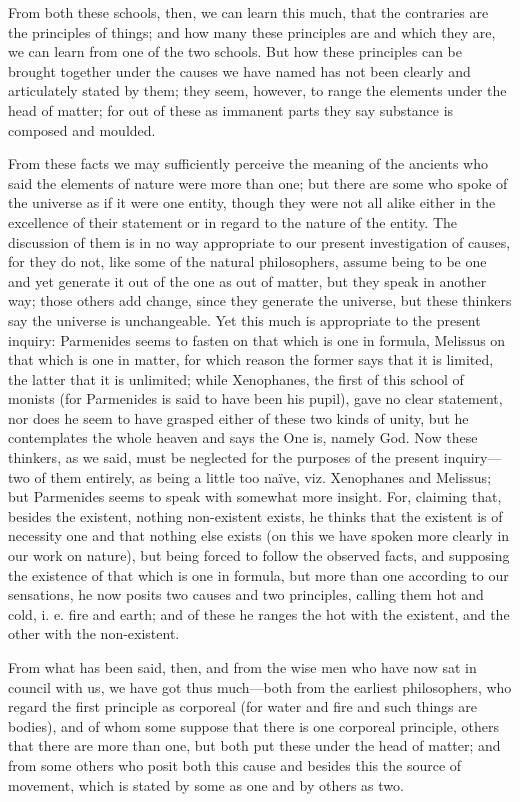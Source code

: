 From both these schools, then, we can learn this much, that the contraries are the principles of things; and how many these principles are and which they are, we can learn from one of the two schools. But how these principles can be brought together under the causes we have named has not been clearly and articulately stated by them; they seem, however, to range the elements under the head of matter; for out of these as immanent parts they say substance is composed and moulded.

From these facts we may sufficiently perceive the meaning of the ancients who said the elements of nature were more than one; but there are some who spoke of the universe as if it were one entity, though they were not all alike either in the excellence of their statement or in regard to the nature of the entity. The discussion of them is in no way appropriate to our present investigation of causes, for they do not, like some of the natural philosophers, assume being to be one and yet generate it out of the one as out of matter, but they speak in another way; those others add change, since they generate the universe, but these thinkers say the universe is unchangeable. Yet this much is appropriate to the present inquiry: Parmenides seems to fasten on that which is one in formula, Melissus on that which is one in matter, for which reason the former says that it is limited, the latter that it is unlimited; while Xenophanes, the first of this school of monists (for Parmenides is said to have been his pupil), gave no clear statement, nor does he seem to have grasped either of these two kinds of unity, but he contemplates the whole heaven and says the One is, namely God. Now these thinkers, as we said, must be neglected for the purposes of the present inquiry—two of them entirely, as being a little too naïve, viz. Xenophanes and Melissus; but Parmenides seems to speak with somewhat more insight. For, claiming that, besides the existent, nothing non-existent exists, he thinks that the existent is of necessity one and that nothing else exists (on this we have spoken more clearly in our work on nature), but being forced to follow the observed facts, and supposing the existence of that which is one in formula, but more than one according to our sensations, he now posits two causes and two principles, calling them hot and cold, i. e. fire and earth; and of these he ranges the hot with the existent, and the other with the non-existent.

From what has been said, then, and from the wise men who have now sat in council with us, we have got thus much—both from the earliest philosophers, who regard the first principle as corporeal (for water and fire and such things are bodies), and of whom some suppose that there is one corporeal principle, others that there are more than one, but both put these under the head of matter; and from some others who posit both this cause and besides this the source of movement, which is stated by some as one and by others as two.

